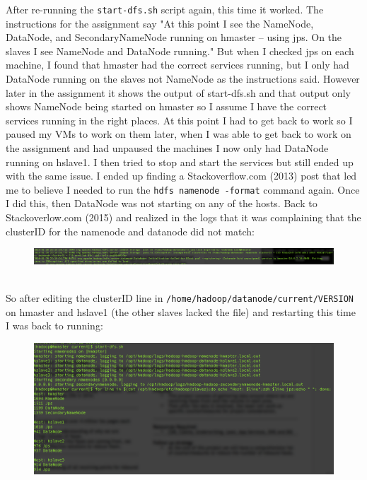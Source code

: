 \documentclass[10pt]{article}
\begin{document}
\par
After re-running the  \verb|start-dfs.sh| script again, this time it worked. The instructions for the assignment say "At this point I see the NameNode, DataNode, and SecondaryNameNode running on hmaster – using jps. On the slaves I see NameNode and DataNode running." But when I checked jps on each machine, I found that hmaster had the correct services running, but I only had DataNode running on the slaves not NameNode as the instructions said. However later in the assignment it shows the output of start-dfs.sh and that output only shows NameNode being started on hmaster so I assume I have the correct services running in the right places. At this point I had to get back to work so I paused my VMs to work on them later, when I was able to get back to work on the assignment and had unpaused the machines I now only had DataNode running on hslave1. I then tried to stop and start the services but still ended up with the same issue. I ended up finding a Stackoverflow.com (2013) post that led me to believe I needed to run the \verb|hdfs namenode -format| command again. Once I did this, then DataNode was not starting on any of the hosts. Back to Stackoverlow.com (2015) and realized in the logs that it was complaining that the clusterID for the namenode and datanode did not match:
\begin{figure}[!h]
\includegraphics[scale=0.37]{log_error1.png}
\centering
\end{figure}\\
So after editing the clusterID line in \verb|/home/hadoop/datanode/current/VERSION| on hmaster and hslave1 (the other slaves lacked the file) and restarting this time I was back to running:
\begin{figure}[!h]
\includegraphics[scale=0.37]{success_start.png}
\centering
\end{figure}\\
\end{document}

